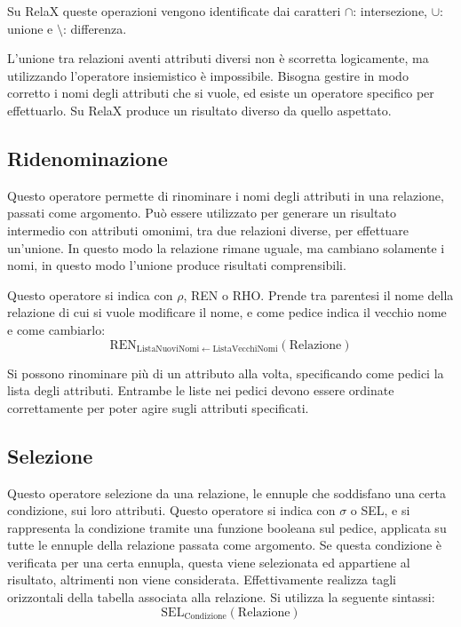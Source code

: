 \documentclass{article}
\numberwithin{equation}{subsection}
\begin{document}
Su RelaX queste operazioni vengono identificate dai caratteri $\cap$: intersezione, $\cup$: unione e $\setminus$: differenza. 

L'unione tra relazioni aventi attributi diversi non è scorretta logicamente, ma utilizzando l'operatore insiemistico è impossibile. Bisogna gestire in modo corretto i nomi degli 
attributi che si vuole, ed esiste un operatore specifico per effettuarlo. Su RelaX produce un risultato diverso da quello aspettato. 

\subsection{Ridenominazione}

Questo operatore permette di rinominare i nomi degli attributi in una relazione, passati come argomento. Può essere utilizzato per generare un risultato intermedio con attributi omonimi, tra due relazioni diverse, 
per effettuare un'unione. In questo modo la relazione rimane uguale, ma cambiano solamente i nomi, in questo modo l'unione produce risultati comprensibili. 

Questo operatore si indica con $\rho$, REN o RHO. Prende tra parentesi il nome della relazione di cui si vuole modificare il nome, e come pedice indica il vecchio nome e come cambiarlo:
\begin{equation}
    \mathrm{REN}_{\mathrm{ListaNuoviNomi}\leftarrow\mathrm{ListaVecchiNomi}}(\mathrm{Relazione})
\end{equation}

Si possono rinominare più di un attributo alla volta, specificando come pedici la lista degli attributi. Entrambe le liste nei pedici devono essere ordinate correttamente per poter agire sugli attributi specificati. 

\subsection{Selezione}

Questo operatore selezione da una relazione, le ennuple che soddisfano una certa condizione, sui loro attributi. Questo operatore si indica con $\sigma$ o SEL, e si rappresenta la condizione tramite una funzione 
booleana sul pedice, applicata su tutte le ennuple della relazione passata come argomento. Se questa condizione è verificata per una certa ennupla, questa viene selezionata ed appartiene al risultato, altrimenti non 
viene considerata. 
Effettivamente realizza tagli orizzontali della tabella associata alla relazione. Si utilizza la seguente sintassi:
\begin{equation}
    \mathrm{SEL}_{\mathrm{{Condizione}}}(\mathrm{Relazione})
\end{equation}
\end{document}

